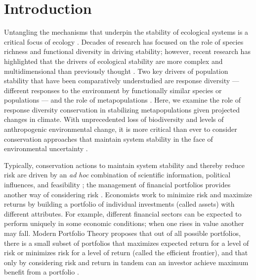 \noindent


\section{Introduction}

Untangling the mechanisms that underpin the stability of ecological systems is a critical focus of ecology \citep[e.g.][]{ives2007, demazancourt2013}. Decades of research has focused on the role of species richness and functional diversity in driving stability; however, recent research has highlighted that the drivers of ecological stability are more complex and multidimensional than previously thought \citep[e.g.][]{balvanera2006, ives2007, demazancourt2013}. Two key drivers of population stability that have been comparatively understudied are response diversity \citep{winfree2009, mori2013} --- different responses to the environment by functionally similar species or populations \citep{elmqvist2003} --- and the role of metapopulations \citep{schtickzelle2007}. Here, we examine the role of response diversity conservation in stabilizing metapopulations given projected changes in climate. With unprecedented loss of biodiversity and levels of anthropogenic environmental change, it is more critical than ever to consider conservation approaches that maintain system stability in the face of environmental uncertainty \citep{lee2008, ando2012}.

Typically, conservation actions to maintain system stability and thereby reduce risk are driven by an \emph{ad hoc} combination of scientific information, political influences, and feasibility \citep{margules2000}; the management of financial portfolios provides another way of considering risk \citep[e.g.][]{figge2004, koellner2006, ando2012, haak2012}. Economists work to minimize risk and maximize returns by building a portfolio of individual investments (called assets) with different attributes. For example, different financial sectors can be expected to perform uniquely in some economic conditions; when one rises in value another may fall. Modern Portfolio Theory proposes that out of all possible portfolios, there is a small subset of portfolios that maximizes expected return for a level of risk or minimizes risk for a level of return (called the efficient frontier), and that only by considering risk and return in tandem can an investor achieve maximum benefit from a portfolio \citep{markowitz1952}.

